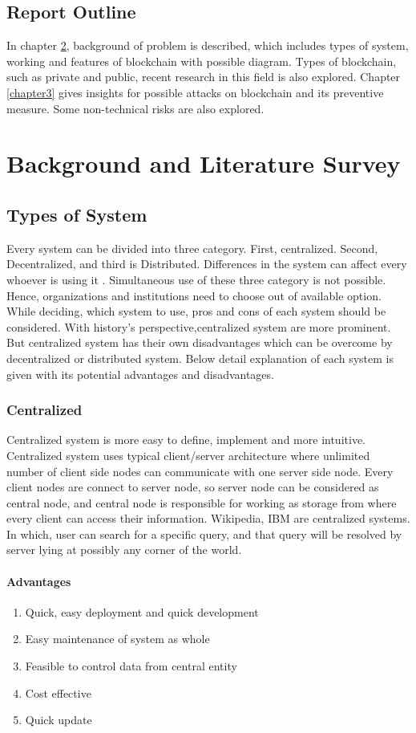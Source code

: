 \documentclass[a4paper,twoside,12pt]{report}
\begin{document}
\begin{spacing}{1.5}
\section{Report Outline}
In chapter \ref{chapter2}, background of problem is described, which includes types of system, working and features of blockchain with possible diagram. Types of blockchain, such as private and public, recent research in this field is also explored. Chapter \ref{chapter3} gives insights for possible attacks on blockchain and its preventive measure. Some non-technical risks are also explored.
\chapter{Background and Literature Survey}
\label{chapter2}
\section{Types of System}
Every system can be divided into three category. First, centralized. Second, Decentralized, and third is Distributed. Differences in the system can affect every whoever is using it \cite{gfg_cent_vs_decent}. Simultaneous use of these three category is not possible. Hence, organizations and institutions need to choose out of available option. While deciding, which system to use, pros and cons of each system should be considered. With history's perspective,centralized system are more prominent. But centralized system has their own disadvantages which can be overcome by decentralized or distributed system. Below detail explanation of each system is given with its potential advantages and disadvantages.
\subsection{Centralized}
Centralized system is more easy to define, implement and more intuitive. Centralized system uses typical client/server architecture where unlimited number of client side nodes can communicate with one server side node. Every client nodes are connect to server node, so server node can be considered as central node, and central node is responsible for working as storage from where every client can access their information. 
Wikipedia, IBM are centralized systems. In which, user can search for a specific query, and that query will be resolved by server lying at possibly any corner of the world.
\subsubsection{Advantages}
\begin{enumerate}
\item{Quick, easy deployment and quick development}
\item{Easy maintenance of system as whole}
\item{Feasible to control data from central entity}
\item{Cost effective}
\item{Quick update}
\end{enumerate}

\end{spacing}
\end{document}

